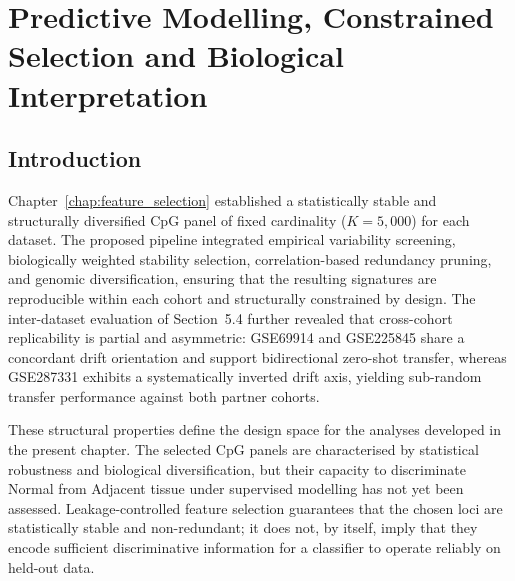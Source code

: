 \chapter{Predictive Modelling, Constrained Selection and Biological Interpretation}
\label{chap:model_training_evaluation}

\section{Introduction}

Chapter~\ref{chap:feature_selection} established a statistically stable and 
structurally diversified CpG panel of fixed cardinality ($K = 5{,}000$) for 
each dataset. The proposed pipeline integrated empirical variability screening, 
biologically weighted stability selection, correlation-based redundancy pruning, 
and genomic diversification, ensuring that the resulting signatures are 
reproducible within each cohort and structurally constrained by design. 
The inter-dataset evaluation of Section~5.4 further revealed that cross-cohort 
replicability is partial and asymmetric: GSE69914 and GSE225845 share a 
concordant drift orientation and support bidirectional zero-shot transfer, 
whereas GSE287331 exhibits a systematically inverted drift axis, yielding 
sub-random transfer performance against both partner cohorts.

These structural properties define the design space for the analyses developed 
in the present chapter. The selected CpG panels are characterised by statistical 
robustness and biological diversification, but their capacity to discriminate 
Normal from Adjacent tissue under supervised modelling has not yet been 
assessed. Leakage-controlled feature selection guarantees that the chosen loci 
are statistically stable and non-redundant; it does not, by itself, imply that 
they encode sufficient discriminative information for a classifier to operate 
reliably on held-out data.

